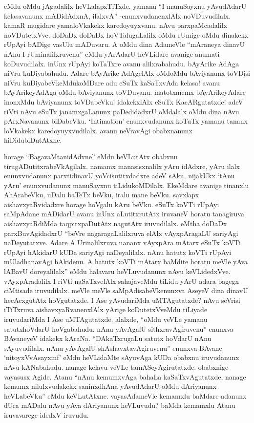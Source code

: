 eMdu oMdu jAgadalilx heVLalapxTiTxde. yamanu ``I manuSayxnu yAvudAdarU kelasavanunx mADidAdxnA, ilalxvA'' -enunxvudanenxlAlx noVDuvudilalx. kamaR mugidare yamaloVkakekx karedoyuyxvanu. nAvu parxpaMcadalilx noVDutetxVve. doDaDx doDaDx hoVTalugaLalilx oMdu rUmige oMdu dinakekx {} rUpAyi bADige vasUlu mADuvaru. A oMdu dina AdameVle ``mAraneya dinavU nAnu I rUminalilxruvenu'' eMdu yArAdarU heVLidare avanige anumati koDuvudilalx. inUnx {} rUpAyi koTaTxre avanu alilxrabahudu. bAyArike AdAga niVru kuDiyabahudu. Adare bAyArike AdAgelAlx oMdoMdu bAviyanunx toVDisi niVru kuDiyabeVkeMdukoMDare adu eSuTx kaSaTxvAda kelasa! avanu bAyArikeyAdAga oMdu bAviyanunx toVDuvanu. matotxmemx bAyArikeyAdare inonxMdu bAviyanunx toVDabeVku! idakekxlAlx eSuTx KacARgutatxde! adeV riVti nAvu eSuTx janamxgaLanunx paDedidadxrU oMdalalx oMdu dina nAvu pArxNavanunx biDabeVku. `{\eng Intimation}' enunxvudanunx koTuTx yamanu tananx loVkakekx karedoyuyxvudilalx. avanu neVravAgi obabxnanunx hiDidubiDutAtxne.

horage ``BagavaMtanidAdxne'' eMdu heVLutAtx obabxnu tirugADutitxrabeVkAgilalx. namamx manasisxnalilx yAru idAdxre, yAru ilalx enunxvudanunx parxtidinavU yoVcisutitxdadxre adeV sAku. nijakUkx `tAnu yAru' enunxvudanunx manuSayxnu tiLidukoMDilalx. EkeMdare avanige tinanxlu AhArabeVku, uDalu baTeTx beVku, iralu mane beVku. savxlapx aishavxyaRvidadxre horage hoVgalu kAru beVku. eSuTx koVTi rUpAyi saMpAdane mADidarU avanu inUnx aLutitxrutAtx iruvaneV horatu tanagiruva aishavxyaRdiMda taqpitxpaDutAtx nagutAtx iruvudilalx. eMtha doDaDx parxBuvAgidadxrU ``beVre nagaragaLalilxruva elAlx vAyxpAragaLU sariyAgi naDeyutatxve. Adare A Urinalilxruva nananx vAyxpAra mAtarx eSuTx koVTi rUpAyi hAkidarU kUDa sariyAgi naDeyalilalx. nAnu hatutx koVTi rUpAyi mUladhanavAgi hAkidenu. A hatutx koVTi mAtarx baMdite horatu meVle yAva lABavU doreyalilalx'' eMdu halavaru heVLuvudanunx nAvu keVLidedxVve. vAyxpAradalilx I riVti naSaTxvelAlx sahajaveMdu tiLidu yArU adara bagegx ciMtisade iruvudilalx. meVle meVle saMpAdisabeVkenunxva AseyeV dina dinavU hecAcxgutAtx hoVgutatxde. I Ase yAvudariMda uMTAgutatxde? nAvu seVrisi iTiTxruva aishavxyaRvanenxlAlx yArige koDutetxVveMdu tiLiyade iruvudariMda I Ase uMTAgutatxde. alalxde, ``oMdu veVLe yamanu satutxhoVdarU hoVgabahudu. nAnu yAvAgalU sithxravAgiruvenu'' enunxva BAvaneyeV idakekx kAraNa. ``DAkaTxrugaLu satutx hoVdarU nAnu sAyuvudilalx. nAnu yAvAgalU shAshavxtavAgiruvenu'' enunxva BAvane `nitoyxVvAsayxmf' eMdu heVLidaMte sAyuvAga kUDa obabxnu iruvudanunx nAvu kANabahudu. nanage kelavu veVLe tamASeyAgirutatxde. obabxnige {} vayasusx Agide. Atanu ``nAnu kemumxvAga bahaLa kaSaTxvAgutatxde, nanage kemumx nilulxvudakekx saninxdhAna yAvudAdarU oMdu dAriyanunx heVLabeVku'' eMdu keVLutAtxne. {} vayasAdameVle kemamxlu baMdare adanunx dUra mADalu nAvu yAva dAriyanunx heVLuvudu? baMda kemamxlu Atanu iruvavarege idedxV iruvudu.

